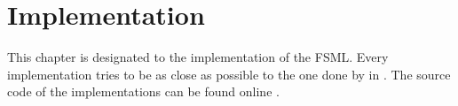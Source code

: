 \chapter{Implementation}
\label{c:implementation}

This chapter is designated to the implementation of the FSML.
Every implementation tries to be as close as possible to the one done by \citeauthor{laemmel2014} in  \cite{laemmel2014}.
The source code of the implementations can be found online \cite{langtechs}.







